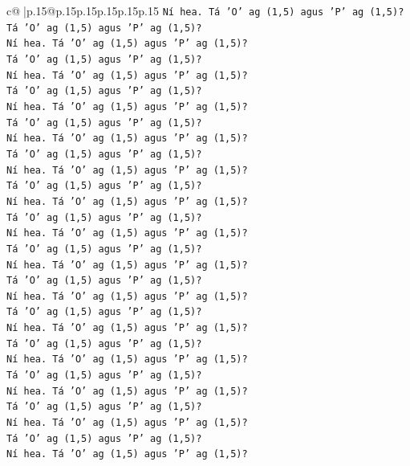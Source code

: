 \documentclass{article}
\begin{document}
{\begin{supertabular}{c@{$\;$}|p{.15\linewidth}@{}p{.15\linewidth}p{.15\linewidth}p{.15\linewidth}p{.15\linewidth}p{.15\linewidth}}
{{{\texttt{Ní hea. Tá 'O' ag (1,5) agus 'P' ag (1,5)?} \\
\texttt{Tá 'O' ag (1,5) agus 'P' ag (1,5)?} \\
\texttt{Ní hea. Tá 'O' ag (1,5) agus 'P' ag (1,5)?} \\
\texttt{Tá 'O' ag (1,5) agus 'P' ag (1,5)?} \\
\texttt{Ní hea. Tá 'O' ag (1,5) agus 'P' ag (1,5)?} \\
\texttt{Tá 'O' ag (1,5) agus 'P' ag (1,5)?} \\
\texttt{Ní hea. Tá 'O' ag (1,5) agus 'P' ag (1,5)?} \\
\texttt{Tá 'O' ag (1,5) agus 'P' ag (1,5)?} \\
\texttt{Ní hea. Tá 'O' ag (1,5) agus 'P' ag (1,5)?} \\
\texttt{Tá 'O' ag (1,5) agus 'P' ag (1,5)?} \\
\texttt{Ní hea. Tá 'O' ag (1,5) agus 'P' ag (1,5)?} \\
\texttt{Tá 'O' ag (1,5) agus 'P' ag (1,5)?} \\
\texttt{Ní hea. Tá 'O' ag (1,5) agus 'P' ag (1,5)?} \\
\texttt{Tá 'O' ag (1,5) agus 'P' ag (1,5)?} \\
\texttt{Ní hea. Tá 'O' ag (1,5) agus 'P' ag (1,5)?} \\
\texttt{Tá 'O' ag (1,5) agus 'P' ag (1,5)?} \\
\texttt{Ní hea. Tá 'O' ag (1,5) agus 'P' ag (1,5)?} \\
\texttt{Tá 'O' ag (1,5) agus 'P' ag (1,5)?} \\
\texttt{Ní hea. Tá 'O' ag (1,5) agus 'P' ag (1,5)?} \\
\texttt{Tá 'O' ag (1,5) agus 'P' ag (1,5)?} \\
\texttt{Ní hea. Tá 'O' ag (1,5) agus 'P' ag (1,5)?} \\
\texttt{Tá 'O' ag (1,5) agus 'P' ag (1,5)?} \\
\texttt{Ní hea. Tá 'O' ag (1,5) agus 'P' ag (1,5)?} \\
\texttt{Tá 'O' ag (1,5) agus 'P' ag (1,5)?} \\
\texttt{Ní hea. Tá 'O' ag (1,5) agus 'P' ag (1,5)?} \\
\texttt{Tá 'O' ag (1,5) agus 'P' ag (1,5)?} \\
\texttt{Ní hea. Tá 'O' ag (1,5) agus 'P' ag (1,5)?} \\
\texttt{Tá 'O' ag (1,5) agus 'P' ag (1,5)?} \\
\texttt{Ní hea. Tá 'O' ag (1,5) agus 'P' ag (1,5)?} \\
}}}
\end{supertabular}}
\end{document}
